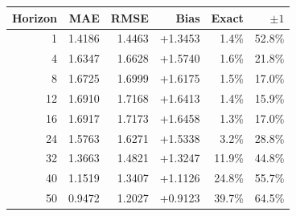\begin{tabular}{rrrrrr}
\hline
Horizon & MAE & RMSE & Bias & Exact & $\pm1$ \\
\hline
1 & 1.4186 & 1.4463 & +1.3453 & 1.4\% & 52.8\% \\
4 & 1.6347 & 1.6628 & +1.5740 & 1.6\% & 21.8\% \\
8 & 1.6725 & 1.6999 & +1.6175 & 1.5\% & 17.0\% \\
12 & 1.6910 & 1.7168 & +1.6413 & 1.4\% & 15.9\% \\
16 & 1.6917 & 1.7173 & +1.6458 & 1.3\% & 17.0\% \\
24 & 1.5763 & 1.6271 & +1.5338 & 3.2\% & 28.8\% \\
32 & 1.3663 & 1.4821 & +1.3247 & 11.9\% & 44.8\% \\
40 & 1.1519 & 1.3407 & +1.1126 & 24.8\% & 55.7\% \\
50 & 0.9472 & 1.2027 & +0.9123 & 39.7\% & 64.5\% \\
\hline
\end{tabular}
